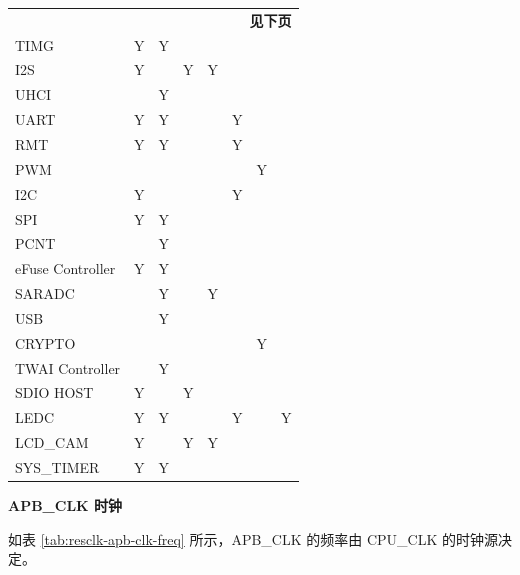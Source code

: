 \documentclass[main\_\_CN.tex]{subfiles}
\begin{document}
\begin{landscape}
\begin{longtable}[c]{|p{2.5cm}|c|c|c|c|c|c|c| }
    \multicolumn{8}{r}{\textbf{见下页}} \\
    \endfoot
    \endlastfoot
    \hline
        TIMG & Y & Y &   &   &   & &\\
        \hline
        I2S  & Y &   &  Y & Y &   & &\\
        \hline
        UHCI &  & Y  &   &   &   & &\\
        \hline
        UART & Y & Y &   &   & Y & &\\
        \hline
        RMT  & Y & Y &   &   & Y & &\\
        \hline
        PWM  &   &   &   &   &   &Y& \\
        \hline
        I2C  & Y &   &   &   & Y & &\\
        \hline
        SPI  & Y & Y &   &   &   & &\\
        \hline
        PCNT &   & Y &    &   &   & &\\
        \hline
        eFuse Controller & Y  & Y &    &   &   & &\\
        \hline
        SARADC &   & Y &   &  Y &   & &\\
        \hline
        USB &   & Y &   &   &   & &\\
        \hline
        CRYPTO  &   &   &   &   &   &Y &\\
        \hline
        TWAI Controller &  & Y &  & & & &\\
        \hline
        SDIO HOST  & Y &  & Y &   &   & &\\
        \hline
        LEDC & Y&  Y & &   &  Y & & Y\\
        \hline
        LCD\_CAM & Y &   & Y &  Y &   & &\\
        \hline
        SYS\_TIMER& Y & Y &   &   &   & &\\
        \hline
\end{longtable}
\end{landscape}

\textbf{APB\_CLK 时钟}

如表 \ref{tab:resclk-apb-clk-freq} 所示，APB\_CLK 的频率由 CPU\_CLK 的时钟源决定。
\end{document}
